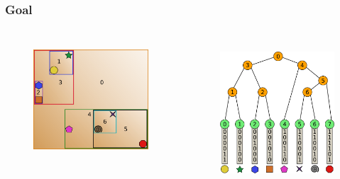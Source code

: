 \documentclass{beamer}
\begin{document}
\begin{frame}
  \frametitle{Goal}
  
\begin{columns}[t]

\begin{figure}
\includegraphics[height=45mm]{primitive-box.png}
\end{figure}

\begin{figure}
\includegraphics[height=55mm]{radix_tree_bare.png}
\end{figure}
\end{columns}
\end{frame}
\end{document}
